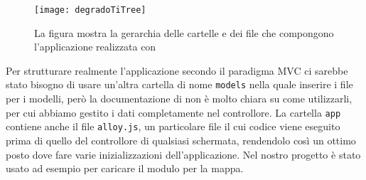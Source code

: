             \begin{figure}[h]
                \centering
                \texttt{[image: degradoTiTree]}
                \caption{
                La figura mostra la gerarchia delle cartelle e dei file che
                compongono l'applicazione realizzata con \tisdk{}
                }
                \label{fig:degradoTiTree}
            \end{figure}

            \noindent Per strutturare realmente l'applicazione secondo il paradigma MVC
            ci sarebbe stato bisogno di usare un'altra cartella di nome \texttt{models}
            nella quale inserire i file \js{} per i modelli, però la documentazione
            di \tisdk{} non è molto chiara su come utilizzarli, per cui
            abbiamo gestito i dati completamente nel controllore.
            \noindent La cartella \texttt{app} contiene anche il file \texttt{alloy.js}, un particolare file
            \js{} il cui codice viene eseguito prima di quello del controllore
            di qualsiasi schermata, rendendolo così un ottimo posto dove fare
            varie inizializzazioni dell'applicazione. Nel nostro progetto è
            stato usato ad esempio per caricare il modulo per la mappa.

